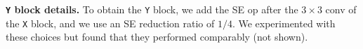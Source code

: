 \documentclass[10pt,twocolumn,letterpaper]{article}
\renewcommand{\paragraph}[1]{\vspace{1.5mm}\noindent\textbf{#1}}
\def\x{{\times}}
\newcommand{\dsname}[1]{\texttt{\small #1}\xspace}
\begin{document}
\paragraph{\dsname{Y} block details.} To obtain the \dsname{Y} block, we add the SE op after the $3 \x 3$ conv of the \dsname{X} block, and we use an SE reduction ratio of $1/4$. We experimented with these choices but found that they performed comparably (not shown).

{\small}
\end{document}

